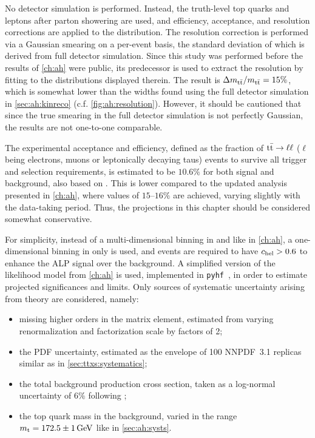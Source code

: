 No detector simulation is performed. Instead, the truth-level top quarks and leptons after parton showering are used, and efficiency, acceptance, and resolution corrections are applied to the \mtt distribution. The resolution correction is performed via a Gaussian smearing on a per-event basis, the standard deviation of which is derived from full detector simulation. Since this study was performed before the results of \cref{ch:ah} were public, its predecessor  is used to extract the resolution by fitting to the \mtt distributions displayed therein. The result is $\Delta m_{\mathrm{t \bar{t}}} / m_{\mathrm{t \bar{t}}} = 15\%$, which is somewhat lower than the widths found using the full detector simulation in \cref{sec:ah:kinreco} (c.f. \cref{fig:ah:resolution}). However, it should be cautioned that since the true \mtt smearing in the full detector simulation is not perfectly Gaussian, the results are not one-to-one comparable. 

The experimental acceptance and efficiency, defined as the fraction of $\mathrm{t \bar{t}} \rightarrow \ell\ell$ ($\ell$ being electrons, muons or leptonically decaying taus) events to survive all trigger and selection requirements, is estimated to be $10.6\%$ for both signal and \ttbar background, also based on . This is lower compared to the updated analysis presented in \cref{ch:ah}, where values of $15$--$16\%$ are achieved, varying slightly with the data-taking period. Thus, the projections in this chapter should be considered somewhat conservative.

For simplicity, instead of a multi-dimensional binning in \mtt and \chel like in \cref{ch:ah}, a one-dimensional binning in \mtt only is used, and events are required to have $c_{\mathrm{hel}} > 0.6$ to enhance the ALP signal over the background.
A simplified version of the likelihood model from \cref{ch:ah} is used, implemented in \texttt{pyhf}~\cite{pyhf_joss}, in order to estimate projected significances and limits. Only sources of systematic uncertainty arising from theory are considered, namely:

\begin{itemize}
    \item missing higher orders in the matrix element, estimated from varying renormalization and factorization scale by factors of 2;
    \item the PDF uncertainty, estimated as the envelope of 100 NNPDF~3.1 replicas~\cite{NNPDF:2017mvq} similar as in \cref{sec:ttxs:systematics};
    \item the total \ttbar background production cross section, taken as a log-normal uncertainty of $6\%$ following ;
    \item the top quark mass in the \ttbar background, varied in the range $\mt = 172.5 \pm 1 \, \si{\GeV}$ like in \cref{sec:ah:systs}.
\end{itemize}

